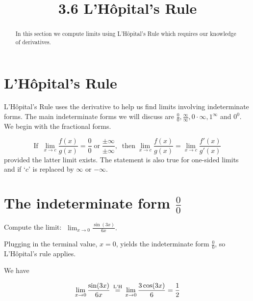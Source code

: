 \documentclass[handout]{ximera}
\title{3.6 L'H\^{o}pital's Rule}
\begin{document}
\begin{abstract}
In this section we compute limits using L'H\^{o}pital's Rule which requires our knowledge of derivatives.
\end{abstract}

\maketitle

\section{L'H\^{o}pital's Rule}

L'H\^{o}pital's Rule uses the derivative to help us find limits involving indeterminate forms. 
The main indeterminate forms we will discuss are $\frac 00, \frac{\infty}{\infty}, 0\cdot \infty, 1^\infty$ and $0^0$. We begin with the fractional forms.

\begin{theorem}

\[
\text{If} \;\; \lim_{x \to c} \frac{f(x)}{g(x)} = \frac{0}{0} \; \text{or} \; \frac{\pm \infty}{\pm \infty},
\;\;\text{then} \; \lim_{x \to c} \frac{f(x)}{g(x)} = \lim_{x \to c} \frac{f'(x)}{g'(x)}
\]
 provided the latter limit exists. The statement is also true for one-sided limits 
 and if `$c$' is replaced by $\infty$ or $-\infty$.
\end{theorem}



\section{The indeterminate form $\frac00$}


\begin{example}[example 1]
Compute the limit: $\displaystyle{\;\lim_{x \to 0} \frac{\sin(3x)}{6x}}.$

Plugging in the terminal value, $x=0$, yields 
the indeterminate form $\frac00$, so L'H\^{o}pital's rule applies.

We have 

\[
\lim_{x \to 0} \frac{\sin(3x)}{6x} \,\overset{\scriptsize\text{L'H}}{=}\, \lim_{x \to 0} \frac{3\cos(3x)}{6} = \frac12
\]
\end{example}
\end{document}
